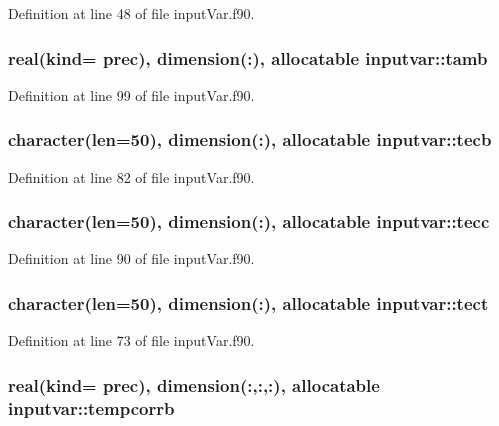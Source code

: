 Definition at line 48 of file input\-Var.\-f90.

\hypertarget{classinputvar_a1cdc501a6b8cb511ab141219362b9aaa}{
\subsubsection[{tamb}]{\setlength{\rightskip}{0pt plus 5cm}real(kind= prec), dimension(\-:), allocatable inputvar\-::tamb}}\label{classinputvar_a1cdc501a6b8cb511ab141219362b9aaa}


Definition at line 99 of file input\-Var.\-f90.

\hypertarget{classinputvar_ab2486a625a1ff1aaf70cb9e38d8c07db}{
\subsubsection[{tecb}]{\setlength{\rightskip}{0pt plus 5cm}character(len=50), dimension(\-:), allocatable inputvar\-::tecb}}\label{classinputvar_ab2486a625a1ff1aaf70cb9e38d8c07db}


Definition at line 82 of file input\-Var.\-f90.

\hypertarget{classinputvar_a2eb1c20cfae159c006e0fdc4b9ef0ef0}{
\subsubsection[{tecc}]{\setlength{\rightskip}{0pt plus 5cm}character(len=50), dimension(\-:), allocatable inputvar\-::tecc}}\label{classinputvar_a2eb1c20cfae159c006e0fdc4b9ef0ef0}


Definition at line 90 of file input\-Var.\-f90.

\hypertarget{classinputvar_afb7d5163d753c7bbd2c1505e8ee68197}{
\subsubsection[{tect}]{\setlength{\rightskip}{0pt plus 5cm}character(len=50), dimension(\-:), allocatable inputvar\-::tect}}\label{classinputvar_afb7d5163d753c7bbd2c1505e8ee68197}


Definition at line 73 of file input\-Var.\-f90.

\hypertarget{classinputvar_a4270f23d875d4a85d7bd5d6699205d03}{
\subsubsection[{tempcorrb}]{\setlength{\rightskip}{0pt plus 5cm}real(kind= prec), dimension(\-:,\-:,\-:), allocatable inputvar\-::tempcorrb}}\label{classinputvar_a4270f23d875d4a85d7bd5d6699205d03}


